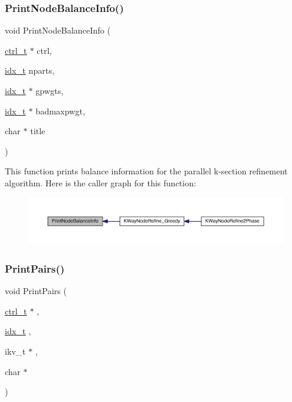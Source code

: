 \mbox{\label{a00951_acdec4b1616feceaea827df6448d17740}} 
\subsubsection{\texorpdfstring{Print\+Node\+Balance\+Info()}{PrintNodeBalanceInfo()}}
{\footnotesize\ttfamily void Print\+Node\+Balance\+Info (\begin{DoxyParamCaption}\item[{\hyperlink{a00742}{ctrl\+\_\+t} $\ast$}]{ctrl,  }\item[{\hyperlink{a00876_aaa5262be3e700770163401acb0150f52}{idx\+\_\+t}}]{nparts,  }\item[{\hyperlink{a00876_aaa5262be3e700770163401acb0150f52}{idx\+\_\+t} $\ast$}]{gpwgts,  }\item[{\hyperlink{a00876_aaa5262be3e700770163401acb0150f52}{idx\+\_\+t} $\ast$}]{badmaxpwgt,  }\item[{char $\ast$}]{title }\end{DoxyParamCaption})}

This function prints balance information for the parallel k-\/section refinement algorithm. Here is the caller graph for this function\+:\nopagebreak
\begin{figure}[H]
\begin{center}
\leavevmode
\includegraphics[width=350pt]{a00951_acdec4b1616feceaea827df6448d17740_icgraph}
\end{center}
\end{figure}
\mbox{\label{a00951_aef7bccd0143fad5ab5cdf7c77eec8154}} 
\subsubsection{\texorpdfstring{Print\+Pairs()}{PrintPairs()}}
{\footnotesize\ttfamily void Print\+Pairs (\begin{DoxyParamCaption}\item[{\hyperlink{a00742}{ctrl\+\_\+t} $\ast$}]{,  }\item[{\hyperlink{a00876_aaa5262be3e700770163401acb0150f52}{idx\+\_\+t}}]{,  }\item[{ikv\+\_\+t $\ast$}]{,  }\item[{char $\ast$}]{ }\end{DoxyParamCaption})}

